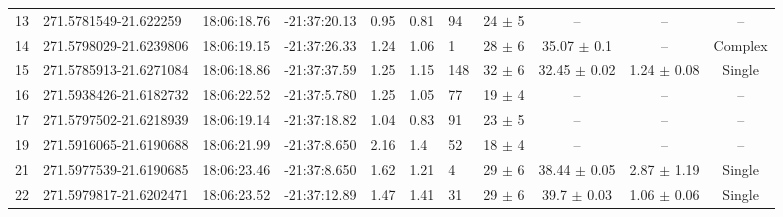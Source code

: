 \begin{table}[htp]
\begin{tabular}{llllllllccc}
13  &  271.5781549-21.622259  &  18:06:18.76  &  -21:37:20.13  &  0.95  &  0.81  &  94  &  24 $\pm$ 5  &  --  &  --  &  -- \\
14  &  271.5798029-21.6239806  &  18:06:19.15  &  -21:37:26.33  &  1.24  &  1.06  &  1  &  28 $\pm$ 6  &  35.07 $\pm$ 0.1  &  --  &  Complex \\
15  &  271.5785913-21.6271084  &  18:06:18.86  &  -21:37:37.59  &  1.25  &  1.15  &  148  &  32 $\pm$ 6  &  32.45 $\pm$ 0.02  &  1.24 $\pm$ 0.08  &  Single \\
16  &  271.5938426-21.6182732  &  18:06:22.52  &  -21:37:5.780  &  1.25  &  1.05  &  77  &  19 $\pm$ 4  &  --  &  --  &  -- \\
17  &  271.5797502-21.6218939  &  18:06:19.14  &  -21:37:18.82  &  1.04  &  0.83  &  91  &  23 $\pm$ 5  &  --  &  --  &  -- \\
19  &  271.5916065-21.6190688  &  18:06:21.99  &  -21:37:8.650  &  2.16  &  1.4  &  52  &  18 $\pm$ 4  &  --  &  --  &  -- \\
21  &  271.5977539-21.6190685  &  18:06:23.46  &  -21:37:8.650  &  1.62  &  1.21  &  4  &  29 $\pm$ 6  &  38.44 $\pm$ 0.05  &  2.87 $\pm$ 1.19  &  Single \\
22  &  271.5979817-21.6202471  &  18:06:23.52  &  -21:37:12.89  &  1.47  &  1.41  &  31  &  29 $\pm$ 6  &  39.7 $\pm$ 0.03  &  1.06 $\pm$ 0.06  &  Single \\
\hline 
\end{tabular}
\end{table}


